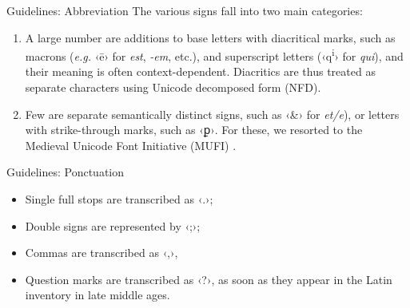 \documentclass[aspectratio=169]{beamer}
\newcommand{\juni}[1]{{\junicodeFont #1}}
\newcommand{\character}[1]{{‹#1›}}
\begin{document}
\begin{frame}{Guidelines: Abbreviation}
    The various signs fall into two main categories:
    \begin{enumerate}
        \item A large number are additions to base letters with diacritical marks, such as macrons (\textit{e.g.} \character{ē} for \textit{est}, \textit{-em}, etc.), and superscript letters (\character{q\textsuperscript{i}} for \textit{qui}), and their meaning is often context-dependent. Diacritics are thus treated as separate characters using Unicode decomposed form (NFD).
        \item Few are separate semantically distinct signs, such as \character{\&} for \textit{et/e}), or letters with strike-through marks, such as \character{\juni{ꝑ}}. For these, we resorted to the  Medieval Unicode Font Initiative (MUFI) \cite{mufi2009}.
    \end{enumerate}
\end{frame}

\begin{frame}{Guidelines: Ponctuation}
    \begin{itemize}
        \item Single full stops are transcribed as \character{.};
        \item Double signs are represented by \character{;};
        \item Commas are transcribed as \character{,},
        \item Question marks are transcribed as \character{?}, as soon as they appear in the Latin inventory in late middle ages.
    \end{itemize}
\end{frame}
\end{document}
